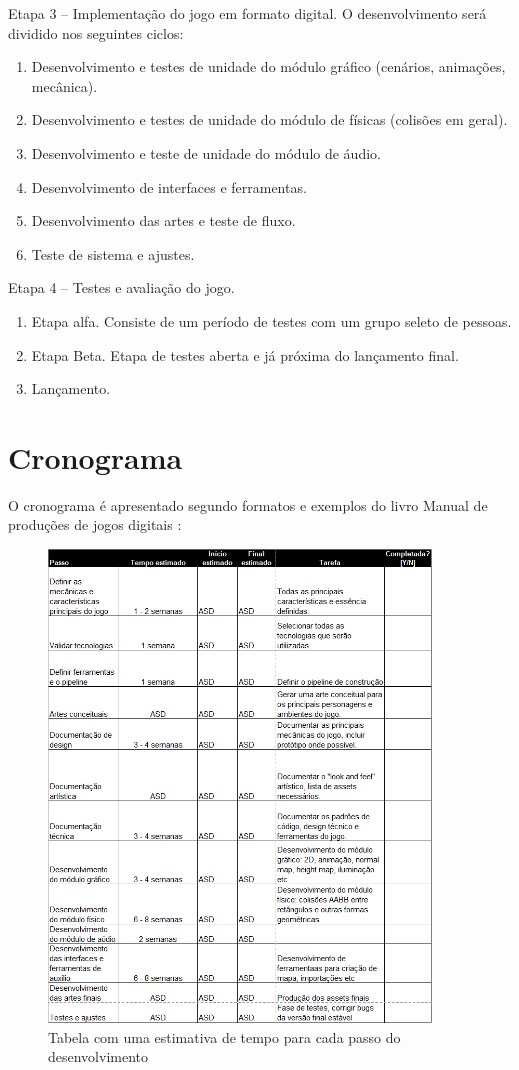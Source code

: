 \documentclass[12pt, 
openright, 
oneside, 
a4paper,    
brazil]{facom-ufu-abntex2}
\begin{document}
Etapa 3 – Implementação do jogo em formato digital. O desenvolvimento será dividido nos seguintes ciclos:
\begin{enumerate}
\item Desenvolvimento e testes de unidade do módulo gráfico
(cenários, animações, mecânica).
\item Desenvolvimento e testes de unidade do módulo de físicas
(colisões em geral).
\item Desenvolvimento e teste de unidade do módulo de áudio.
\item Desenvolvimento de interfaces e ferramentas.
\item Desenvolvimento das artes e teste de fluxo.
\item Teste de sistema e ajustes.
\end{enumerate}
Etapa 4 – Testes e avaliação do jogo.
\begin{enumerate}
\item Etapa alfa. Consiste de um período de testes com um grupo seleto de pessoas.
\item Etapa Beta. Etapa de testes aberta e já próxima do lançamento final.
\item Lançamento.
\end{enumerate}

\section{Cronograma}
O cronograma é apresentado segundo formatos e exemplos do livro Manual de produções de jogos digitais \cite{Manualdejogosdigitais}:
\begin{figure}[!htb]
	\centering
	\includegraphics[width=4in]{imagens/cronograma.png}
	\caption{Tabela com uma estimativa de tempo para cada passo do desenvolvimento}
\end{figure}
\end{document}
